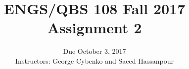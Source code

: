 \documentclass[12pt]{article}
\begin{document}
 


\title{ENGS/QBS 108 Fall 2017 Assignment 2}
\author{Due October 3, 2017 \\ Instructors: George Cybenko and Saeed Hassanpour}
\date{}
\maketitle

\pagebreak

\end{document}
